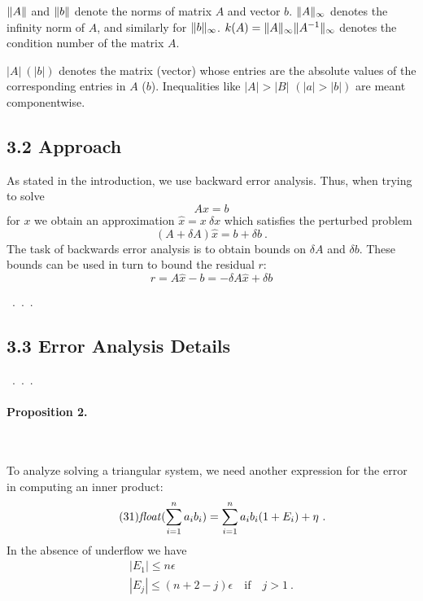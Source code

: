\documentclass[a4paper]{article}
\begin{document}
\newcommand{\norm}[1]{\ensuremath \lVert #1 \rVert}
$\norm{A}$ and $\norm{b}$ denote the norms of matrix $A$ and vector $b$.
$\norm{A}_\infty$ denotes the infinity norm of $A$, and similarly for
$\norm{b}_\infty$.  $k(A)=\norm{A}_\infty\norm{A^{-1}}_\infty$ denotes the condition number
of the matrix $A$.

$|A|~(|b|)$ denotes the matrix (vector) whose entries are the absolute values
  of the corresponding entries in $A$ ($b$).  Inequalities like $|A|>|B|$
  $(|a|>|b|)$ are meant componentwise.

\subsection*{3.2 Approach}

As stated in the introduction, we use backward error analysis.  Thus, when trying
to solve
\begin{equation}\tag{12}
  Ax = b
\end{equation}
for $x$ we obtain an approximation $\hat{x}=x~\delta x$ which satisfies the
perturbed problem
\begin{equation}\tag{13}
  (A+\delta A)\hat{x}=b+\delta b~.
\end{equation}
The task of backwards error analysis is to obtain bounds on $\delta A$ and $\delta b$.
These bounds can be used in turn to bound the residual $r$:
\begin{equation}\tag{14}
  r = A \hat{x}-b = -\delta A \hat{x} + \delta b
\end{equation}

~.~.~.


\subsection*{3.3 Error Analysis Details}

~.~.~.

\paragraph*{Proposition 2.}~

\newcommand\float[1]{\ensuremath \mathit{float}(#1)}
To analyze solving a triangular system, we need another expression for the error in
computing an inner product:
\begin{equation}\tag{31}
  \float{\sum_{i=1}^n a_i b_i} = \sum_{i=1}^n a_i b_i (1 + E_i) + \eta ~.
\end{equation}
In the absence of underflow we have
\begin{equation}\tag{32}
\begin{array}{l}
  |E_1| \le n \epsilon \\
  |E_j| \le (n+2-j)\epsilon \quad \mathrm{if}\quad j>1~.
\end{array}
\end{equation}
\end{document}
